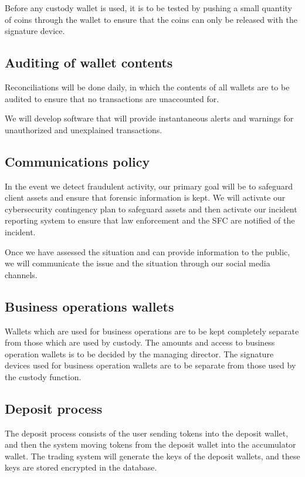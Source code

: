Before any custody wallet is used, it is to be tested by pushing a
small quantity of coins through the wallet to ensure that the coins can
only be released with the signature device.

\subsection{Auditing of wallet contents}

Reconciliations will be done daily, in which the contents of
all wallets are to be audited to ensure that no transactions are
unaccounted for.

We will develop software that will provide instantaneous alerts and
warnings for unauthorized and unexplained transactions.

\subsection{Communications policy}
In the event we detect fraudulent activity, our primary goal will be to
safeguard client assets and ensure that forensic information is kept.
We will activate our cybersecurity contingency plan to safeguard
assets and then activate our incident reporting system to ensure that
law enforcement and the SFC are notified of the incident.

Once we have assessed the situation and can provide
information to the public, we will communicate the issue and the
situation through our social media channels.

\subsection{Business operations wallets}

Wallets which are used for business operations are to be kept
completely separate from those which are used by custody.  The amounts
and access to business operation wallets is to be decided by the
managing director.  The signature devices used for business operation
wallets are to be separate from those used by the custody function.

\subsection{Deposit process}
The deposit process consists of the user sending tokens into the
deposit wallet, and then the system moving tokens from the deposit
wallet into the accumulator wallet.  The trading system will generate
the keys of the deposit wallets, and these keys are stored encrypted
in the database.

